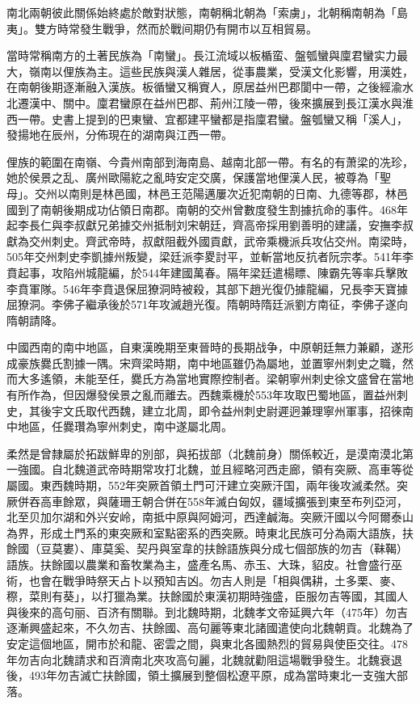 南北兩朝彼此關係始終處於敵對狀態，南朝稱北朝為「索虜」，北朝稱南朝為「島夷」。雙方時常發生戰爭，然而於戰间期仍有開市以互相貿易。

當時常稱南方的土著民族為「南蠻」。長江流域以板楯蛮、盤瓠蠻與廩君蠻实力最大，嶺南以俚族為主。這些民族與漢人雜居，從事農業，受漢文化影響，用漢姓，在南朝後期逐漸融入漢族。板循蠻又稱賨人，原居益州巴郡閬中一帶，之後經渝水北遷漢中、關中。廩君蠻原在益州巴郡、荊州江陵一帶，後來擴展到長江漢水與淮西一帶。史書上提到的巴東蠻、宜都建平蠻都是指廩君蠻。盤瓠蠻又稱「溪人」，發揚地在辰州，分佈現在的湖南與江西一帶。

俚族的範圍在南嶺、今貴州南部到海南島、越南北部一帶。有名的有萧梁的冼珍，她於侯景之乱、廣州歐陽紇之亂時安定交廣，保護當地俚漢人民，被尊為「聖母」。交州以南則是林邑國，林邑王范陽邁屢次近犯南朝的日南、九德等郡，林邑國到了南朝後期成功佔領日南郡。南朝的交州曾數度發生割據抗命的事件。468年起李長仁與李叔獻兄弟據交州抵制刘宋朝廷，齊高帝採用劉善明的建議，安撫李叔獻為交州刺史。齊武帝時，叔獻阻截外國貢獻，武帝乘機派兵攻佔交州。南梁時，505年交州刺史李凱據州叛變，梁廷派李畟討平，並斬當地反抗者阮宗孝。541年李賁起事，攻陷州城龍編，於544年建國萬春。隔年梁廷遣楊瞟、陳霸先等率兵擊敗李賁軍隊。546年李賁退保屈獠洞時被殺，其部下趙光復仍據龍編，兄長李天寶據屈獠洞。李佛子繼承後於571年攻滅趙光復。隋朝時隋廷派劉方南征，李佛子遂向隋朝請降。

中國西南的南中地區，自東漢晚期至東晉時的長期战争，中原朝廷無力兼顧，遂形成豪族爨氏割據一隅。宋齊梁時期，南中地區雖仍為屬地，並置寧州刺史之職，然而大多遙領，未能至任，爨氏方為當地實際控制者。梁朝寧州刺史徐文盛曾在當地有所作為，但因爆發侯景之亂而離去。西魏乘機於553年攻取巴蜀地區，置益州刺史，其後宇文氏取代西魏，建立北周，即令益州刺史尉遲迥兼理寧州軍事，招徠南中地區，任爨瓚為寧州刺史，南中遂屬北周。

柔然是曾隸屬於拓跋鮮卑的別部，與拓拔部（北魏前身）關係較近，是漠南漠北第一強國。自北魏道武帝時期常攻打北魏，並且經略河西走廊，領有突厥、高車等從屬國。東西魏時期，552年突厥首領土門可汗建立突厥汗国，兩年後攻滅柔然。突厥併吞高車餘眾，與薩珊王朝合併在558年滅白匈奴，疆域擴張到東至布列亞河，北至贝加尔湖和外兴安岭，南抵中原與阿姆河，西達鹹海。突厥汗國以今阿爾泰山為界，形成土門系的東突厥和室點密系的西突厥。時東北民族可分為兩大語族，扶餘國（豆莫婁）、庫莫奚、契丹與室韋的扶餘語族與分成七個部族的勿吉（靺鞨）語族。扶餘國以農業和畜牧業為主，盛產名馬、赤玉、大珠，貂皮。社會盛行巫術，也會在戰爭時祭天占卜以預知吉凶。勿吉人則是「相與偶耕，土多栗、麥、穄，菜則有葵」，以打獵為業。扶餘國於東漢初期時強盛，臣服勿吉等國，其國人與後來的高句丽、百济有關聯。到北魏時期，北魏孝文帝延興六年（475年）勿吉逐漸興盛起來，不久勿吉、扶餘國、高句麗等東北諸國遣使向北魏朝貢。北魏為了安定這個地區，開市於和龍、密雲之間，與東北各國熱烈的貿易與使臣交往。478年勿吉向北魏請求和百濟南北夾攻高句麗，北魏就勸阻這場戰爭發生。北魏衰退後，493年勿吉滅亡扶餘國，領土擴展到整個松遼平原，成為當時東北一支強大部落。

